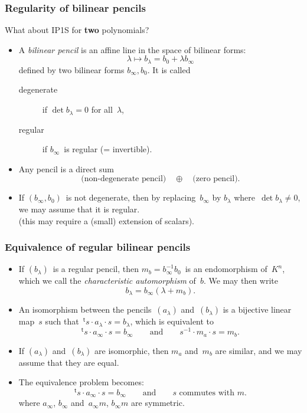 \documentclass{beamer}%
\def\transpose{{}^{\mathrm{\scriptscriptstyle t}}\!}
\def\strong#1{{\bf\color{rouge}#1}}
\let\mathrm\mathsf
\begin{document}
\begin{frame}\frametitle{Regularity of bilinear pencils}%
What about IP1S for \strong{two} polynomials?
\begin{itemize}
\item A \emph{bilinear pencil} is an affine line in the space of bilinear
forms:
\begin{equation*}
λ ↦  b_{λ} = b_{0} + λ b_{∞}
\end{equation*}
defined by two bilinear forms $b_{∞}, b_{0}$. It is called
\begin{description}
\item[degenerate] if $\det b_{λ} = 0$ for all~$λ$, \item[regular] if
$b_{∞}$~is regular (= invertible).
\end{description}
\item Any pencil is a direct sum
\begin{equation*}
{\text{(non-degenerate pencil)}}
\quad⊕\quad {\text{(zero pencil)}}.
\end{equation*}
\item If $(b_{∞}, b_{0})$~is not degenerate, then by
replacing~$b_{∞}$ by $b_{λ}$ where~$\det b_{λ} ≠ 0$, we may assume that
it is regular.\\(this may require a (small) extension of scalars).
\end{itemize}
\end{frame}%
\begin{frame}\frametitle{Equivalence of regular bilinear pencils}%
\begin{itemize}
\item If $(b_{λ})$~is a regular pencil, then $m_{b} = b_{∞}^{-1} b_0$~is
an endomorphism of~$K^n$, which we call the \emph{characteristic
automorphism} of~$b$. We may then write
\begin{equation*}
b_{λ} = b_{∞} (λ + m_{b}).
\end{equation*}
\item An isomorphism between the pencils~$(a_{λ})$ and~$(b_{λ})$ is a
bijective linear map~$s$ such that~$\transpose{s} · a_{λ} · s = b_{λ}$,
which is equivalent to
\begin{equation*}
\transpose{s} · a_{∞} · s = b_{∞} \qquad\text{and}\qquad
s^{-1} · m_{a} · s = m_{b}.
\end{equation*}
\item If $(a_{λ})$ and~$(b_{λ})$ are isomorphic, then $m_{a}$ and~$m_{b}$
are similar, and we may assume that they are equal.
\item The equivalence problem becomes:
\begin{equation*}
\transpose{s} · a_{∞} · s = b_{∞} \qquad\text{and}\qquad
\text{$s$~commutes with~$m$.}
\end{equation*}
where $a_{∞}$, $b_{∞}$ and~$a_{∞} m$, $b_{∞} m$ are symmetric.
\end{itemize}
\end{frame}%
\end{document}
